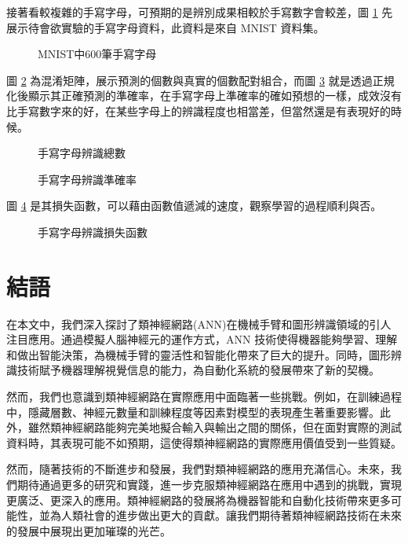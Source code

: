 \documentclass[12pt, a4paper]{article}
\begin{document}
接著看較複雜的手寫字母，可預期的是辨別成果相較於手寫數字會較差，圖 \ref{fig:MNIST中600筆手寫字母} 先展示待會欲實驗的手寫字母資料，此資料是來自 MNIST 資料集。
\begin{figure}[H]
    \caption{MNIST中600筆手寫字母}
    \label{fig:MNIST中600筆手寫字母}
\end{figure}

圖 \ref{fig:手寫字母辨識數量} 為混淆矩陣，展示預測的個數與真實的個數配對組合，而圖 \ref{fig:手寫字母辨識準確率} 就是透過正規化後顯示其正確預測的準確率，在手寫字母上準確率的確如預想的一樣，成效沒有比手寫數字來的好，在某些字母上的辨識程度也相當差，但當然還是有表現好的時候。

\begin{figure}[H]
    \caption{手寫字母辨識總數}
    \label{fig:手寫字母辨識數量}
\end{figure}

\begin{figure}[H]
    \caption{手寫字母辨識準確率}
    \label{fig:手寫字母辨識準確率}
\end{figure}

圖 \ref{fig:手寫字母辨識損失函數} 是其損失函數，可以藉由函數值遞減的速度，觀察學習的過程順利與否。

\begin{figure}[H]
    \caption{手寫字母辨識損失函數}
    \label{fig:手寫字母辨識損失函數}
\end{figure}
\section{結語}
在本文中，我們深入探討了類神經網路(ANN)在機械手臂和圖形辨識領域的引人注目應用。通過模擬人腦神經元的運作方式，ANN 技術使得機器能夠學習、理解和做出智能決策，為機械手臂的靈活性和智能化帶來了巨大的提升。同時，圖形辨識技術賦予機器理解視覺信息的能力，為自動化系統的發展帶來了新的契機。

然而，我們也意識到類神經網路在實際應用中面臨著一些挑戰。例如，在訓練過程中，隱藏層數、神經元數量和訓練程度等因素對模型的表現產生著重要影響。此外，雖然類神經網路能夠完美地擬合輸入與輸出之間的關係，但在面對實際的測試資料時，其表現可能不如預期，這使得類神經網路的實際應用價值受到一些質疑。

然而，隨著技術的不斷進步和發展，我們對類神經網路的應用充滿信心。未來，我們期待通過更多的研究和實踐，進一步克服類神經網路在應用中遇到的挑戰，實現更廣泛、更深入的應用。類神經網路的發展將為機器智能和自動化技術帶來更多可能性，並為人類社會的進步做出更大的貢獻。讓我們期待著類神經網路技術在未來的發展中展現出更加璀璨的光芒。
\end{document}
